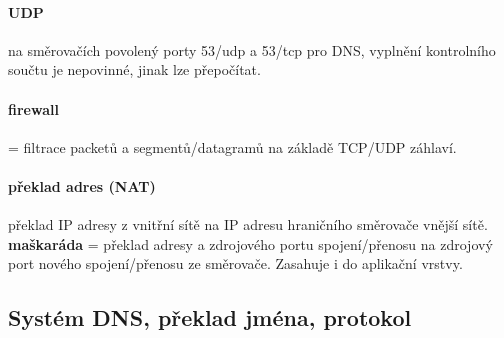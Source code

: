 \documentclass[10pt,a4paper]{article}
\begin{document}
\paragraph{UDP} na směrovačích povolený porty 53/udp a 53/tcp pro DNS, vyplnění kontrolního součtu je nepovinné, jinak lze přepočítat.
\paragraph{firewall} = filtrace packetů a segmentů/datagramů na základě TCP/UDP záhlaví.
\paragraph{překlad adres (NAT)} překlad IP adresy z vnitřní sítě na IP adresu hraničního směrovače vnější sítě. \textbf{maškaráda} = překlad adresy a zdrojového portu spojení/přenosu na zdrojový port nového spojení/přenosu ze směrovače. Zasahuje i do aplikační vrstvy.




\subsection{Systém DNS, překlad jména, protokol}
\end{document}
